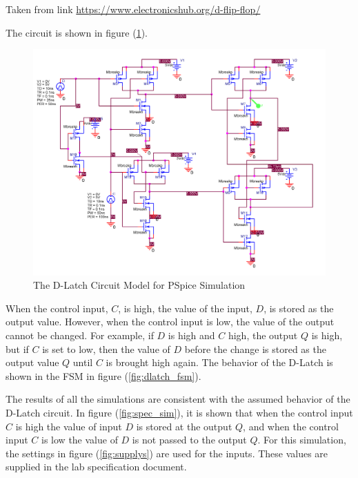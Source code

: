 \FloatBarrier

{\footnotesize Taken from link \url{https://www.electronicshub.org/d-flip-flop/}}

\FloatBarrier

The circuit is shown in figure (\ref{fig:spicecircuit}).

\FloatBarrier

\begin{figure}[h!]
	\centering
	\includegraphics[width=1\linewidth]{./images/spice_circuit}
	\caption{The D-Latch Circuit Model for PSpice Simulation}
	\label{fig:spicecircuit}
\end{figure}

\FloatBarrier

When the control input, $C$, is high, the value of the input, $D$, is stored as the output value. However, when the control input is low, the value of the output cannot be changed. For example, if $D$ is high and $C$ high, the output $Q$ is high, but if $C$ is set to low, then the value of $D$ before the change is stored as the output value $Q$ until $C$ is brought high again. The behavior of the D-Latch is shown in the FSM in figure (\ref{fig:dlatch_fsm}).

The results of all the simulations are consistent with the assumed behavior of the D-Latch circuit. In figure (\ref{fig:spec_sim}), it is shown that when the control input $C$ is high the value of input $D$ is stored at the output $Q$, and when the control input $C$ is low the value of $D$ is not passed to the output $Q$. For this simulation, the settings in figure (\ref{fig:supplys}) are used for the inputs. These values are supplied in the lab specification document.

